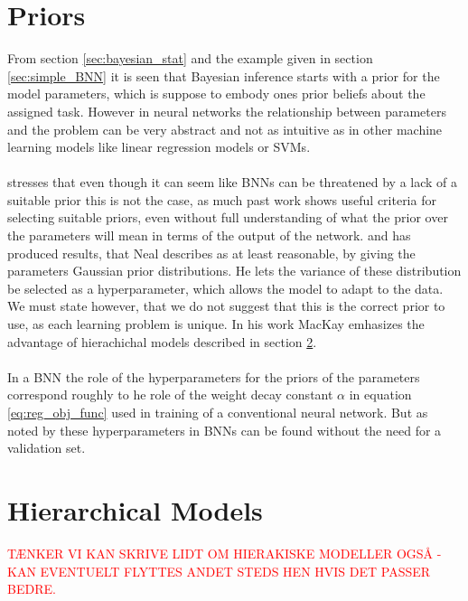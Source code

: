\section{Priors}\label{sec:priors}
From section \ref{sec:bayesian_stat} and the example given in section \ref{sec:simple_BNN} it is seen that Bayesian inference starts with a prior for the model parameters, which is suppose to embody ones prior beliefs about the assigned task. However in neural networks the relationship between parameters and the problem can be very abstract and not as intuitive as in other machine learning models like linear regression models or SVMs. \\
\\
\cite{neal2012bayesian} stresses that even though it can seem like BNNs can be threatened by a lack of a suitable prior this is not the case, as much past work shows useful criteria for selecting suitable priors, even without full understanding of what the prior over the parameters will mean in terms of the output of the network. \cite{mackay1991} and \cite{MacKay1992} has produced results, that Neal describes as at least reasonable, by giving the parameters Gaussian prior distributions. He lets the variance of these distribution be selected as a hyperparameter, which allows the model to adapt to the data. We must state however, that we do not suggest that this is the correct prior to use, as each learning problem is unique. In his work MacKay emhasizes the advantage of hierachichal models described in section \ref{sec:hier_models}.\\
\\
In a BNN the role of the hyperparameters for the priors of the parameters correspond roughly to he role of the weight decay constant $\alpha$ in equation \ref{eq:reg_obj_func} used in training of a conventional neural network. But as noted by \cite{neal2012bayesian} these hyperparameters in BNNs can be found without the need for a validation set.



\section{Hierarchical Models} \label{sec:hier_models}
\textcolor{red}{TÆNKER VI KAN SKRIVE LIDT OM HIERAKISKE MODELLER OGSÅ - KAN EVENTUELT FLYTTES ANDET STEDS HEN HVIS DET PASSER BEDRE.}

\clearpage
